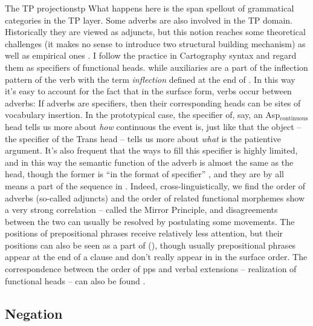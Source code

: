 \documentclass[UTF8, a4paper, oneside, scheme=plain]{ctexrep}
\newcommand*{\citepage}[1]{pp.~{#1}}
\newcommand*{\term}[1]{\emph{#1}}
\begin{document}
\begin{theorybox}{The TP projections}{tp}
    What happens here is the span spellout of grammatical categories in the TP layer.
    Some adverbs are also involved in the TP domain.
    Historically they are viewed as adjuncts,
    but this notion reaches some theoretical challenges 
    (it makes no sense to introduce two structural building mechanism)
    as well as empirical ones \citep{sportiche2017fewer}.
    I follow the practice in Cartography syntax and regard them as specifiers of functional heads.
    while auxiliaries are a part of the inflection pattern of the verb 
    with the term \term{inflection} defined 
    at the end of .
    In this way it's easy to account for the fact that 
    in the surface form, verbs occur between adverbs:
    If adverbs are specifiers,
    then their corresponding heads can be sites of vocabulary insertion.
    In the prototypical case, 
    the specifier of, say, an Asp$_{\text{continuous}}$ head 
    tells us more about \emph{how} continuous the event is,
    just like that the object -- the specifier of the Trans head -- 
    tells us more about \emph{what} is the patientive argument.
    It's also frequent that the ways to fill this specifier is highly limited,
    and in this way the semantic function of the adverb 
    is almost the same as the head, though the former is ``in the format of specifier''
    \citep{shlonsky2010cartographic},
    and they are by all means a part of the sequence in .
    Indeed, cross-linguistically, 
    we find the order of adverbs (so-called adjuncts) and the order of related functional morphemes 
    show a very strong correlation -- called the Mirror Principle,
    and disagreements between the two can usually be resolved by postulating some movements.
    The positions of prepositional phrases receive relatively less attention,
    but their positions can also be seen as a part of 
    (\citealt[\citepage{106}]{schweikert2005order}),
    though usually prepositional phrases appear at the end of a clause 
    and don't really appear in  in the surface order.
    The correspondence between the order of \acs{pp}s and verbal extensions 
    -- realization of functional heads -- 
    can also be found \citep[\citepage{160}]{cinque2006restructuring}.
\end{theorybox}

\subsection{Negation} 
\end{document}

